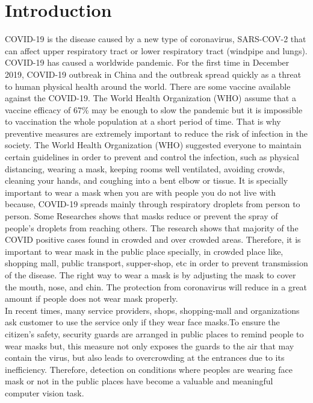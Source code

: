 \documentclass[conference]{IEEEtran}
\begin{document}
\section{Introduction}
COVID-19 is the disease caused by a new type of coronavirus, SARS-COV-2 that can affect upper respiratory tract or lower respiratory tract (windpipe and lungs). COVID-19 has caused 
a worldwide pandemic. For the first time in December 2019, COVID-19 outbreak in China and the outbreak spread quickly as a threat to human physical health around the world. There are some vaccine available against the COVID-19. The World Health Organization (WHO) assume that  a vaccine efficacy of 67\% may be enough to slow the pandemic\cite{VACCINE} but it is impossible to vaccination the whole population at a short period of time. That is why preventive measures are extremely important to reduce the risk of infection in the society. The World Health Organization (WHO) suggested everyone to maintain certain guidelines in order to prevent and control the infection, such as physical distancing, wearing a mask, keeping rooms well ventilated, avoiding crowds, cleaning your hands, and coughing into a bent elbow or tissue\cite{feng2020rational}. It is specially important to wear a mask when you are with people you do not live with because, COVID-19 spreads mainly through respiratory droplets from person to person. Some Researches shows that masks reduce or prevent the spray of people's droplets from reaching others\cite{leung2020respiratory}. The research shows that majority of the COVID positive cases found in crowded and over crowded areas\cite{agarwal2020face}. Therefore, it is important to wear mask in the public place specially, in crowded place like, shopping mall, public transport, supper-shop, etc in order to prevent transmission of the disease\cite{feng2020rational}.
The right way to wear a mask is by adjusting the mask to cover the mouth, nose, and chin\cite{WHO}. The protection from coronavirus will reduce in a great amount if people does not wear mask properly\cite{jiang2021real}. \\

In recent times, many service providers, shops, shopping-mall and organizations ask customer to use the service only if they wear face masks\cite{fang2020transmission}.To ensure the citizen's safety, security guards are arranged in public places to remind people to wear masks but, this measure not only exposes the guards to the air that may contain the virus, but also leads to overcrowding at the entrances due to its inefficiency\cite{jiang2021real}. Therefore, detection on conditions where peoples are wearing face mask or not in the public places have become a valuable and meaningful computer vision task\cite{zhang2021novel}. \\
\end{document}

